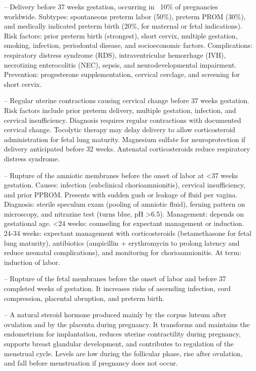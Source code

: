 -- Delivery before 37 weeks gestation, occurring in ~10\% of pregnancies worldwide. Subtypes: spontaneous preterm labor (50\%), preterm PROM (30\%), and medically indicated preterm birth (20\%, for maternal or fetal indications). Risk factors: prior preterm birth (strongest), short cervix, multiple gestation, smoking, infection, periodontal disease, and socioeconomic factors. Complications: respiratory distress syndrome (RDS), intraventricular hemorrhage (IVH), necrotizing enterocolitis (NEC), sepsis, and neurodevelopmental impairment. Prevention: progesterone supplementation, cervical cerclage, and screening for short cervix.

-- Regular uterine contractions causing cervical change before 37 weeks gestation. Risk factors include prior preterm delivery, multiple gestation, infection, and cervical insufficiency. Diagnosis requires regular contractions with documented cervical change. Tocolytic therapy may delay delivery to allow corticosteroid administration for fetal lung maturity. Magnesium sulfate for neuroprotection if delivery anticipated before 32 weeks. Antenatal corticosteroids reduce respiratory distress syndrome.

-- Rupture of the amniotic membranes before the onset of labor at <37 weeks gestation. Causes: infection (subclinical chorioamnionitis), cervical insufficiency, and prior PPROM. Presents with sudden gush or leakage of fluid per vagina. Diagnosis: sterile speculum exam (pooling of amniotic fluid), ferning pattern on microscopy, and nitrazine test (turns blue, pH >6.5). Management: depends on gestational age. <24 weeks: counseling for expectant management or induction. 24-34 weeks: expectant management with corticosteroids (betamethasone for fetal lung maturity), antibiotics (ampicillin + erythromycin to prolong latency and reduce neonatal complications), and monitoring for chorioamnionitis. At term: induction of labor.

-- Rupture of the fetal membranes before the onset of labor and before 37 completed weeks of gestation. It increases risks of ascending infection, cord compression, placental abruption, and preterm birth.

-- A natural steroid hormone produced mainly by the corpus luteum after ovulation and by the placenta during pregnancy. It transforms and maintains the endometrium for implantation, reduces uterine contractility during pregnancy, supports breast glandular development, and contributes to regulation of the menstrual cycle. Levels are low during the follicular phase, rise after ovulation, and fall before menstruation if pregnancy does not occur.

